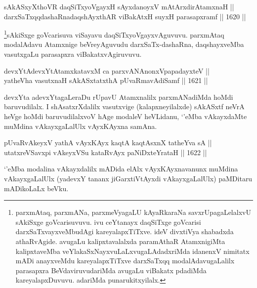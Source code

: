 
\begin{shl}
sAkASxyXthoVR daqSiTxyoVgayxH sAyxdanoyxV mAtArxdirAtamxnaH || \\
darxSaTxqqdashaRnadaqshAyxthAR viBakAtxH suyxH parasapxramf \hfill || 1620 ||  
\end{shl}

\begin{artha}
\footnote{parxmAtaq, parxmANa, parxmeVyagaLU kAyaRkaraNa savxrUpagaLelalxvU sAkiSxge goVcarisuvuvu. ivu ceYtanayx daqSiTxge goVcarisi darxSaTxvayxveMbudAgi kareyalapxTiTxve. ideV divxtiVya shabadxda athaRvAgide. avugaLu kalipxtavalalxda paramAthaR AtamxnigiMta kalipxtaveMba veYlakaSxNayxvuLaLxvugaLAdadxriMda idanenxV nimitatx mADi anayxveMdu kareyalapxTiTxve darxSaTxqq modalAdavugaLalilx parasapxra BeVdaviruvudariMda avugaLu viBakatx pdadiMda kareyalapxDuvuvu. adariMda punarukitxyilalx.}sAkiSxge goVcarisuva viSayavu daqSiTxyoVgayxvAguvuvu. parxmAtaq modalAdavu Atamxnige beVreyAguvudu darxSaTx-dashaRna, daqshayxveMba vasutxgaLu parasapxra viBakatxvAgiruvuvu.
\end{artha}


\begin{shl}
devxYtAdevxYtAtamxkatavxM ca parxvANAnonxVpapadayxteV || \\
yatheVha vasutxnaH sAkASxtatxthA pUvaRmavAdiSamf \hfill || 1621 ||  
\end{shl}

\begin{artha}
devxYta adevxYtagaLeraDu rUpavU Atamxnalilx parxmANadiMda hoMdi baruvudilalx. I shAsatxrXdalilx vasutxvige (kalapxneyilalxde) sAkASxtf neVrA heVge hoMdi baruvudilalxvoV hAge modaleV heVLidanu, `\stext'eMba vAkayxdaMte muMdina vAkayxgaLalUlx vAyxKAyxna samAna.
\end{artha}

\begin{shl}
pUvaRvAkeyxV yathA vAyxKAyx kaqtA kaqtAsxnX tatheYva sA || \\
utatxreVSavxpi vAkeyxVSu kataRvAyx paNiDxteYrataH \hfill || 1622 ||  
\end{shl}

\begin{artha}
`\stext'eMba modalina vAkayxdalilx mADida elAlx vAyxKAyxnavanunx muMdina vAkayxgaLalUlx (yadevxY tananx jiGarxtiVtAyxdi vAkayxgaLalUlx) paMDitaru mADikoLaLx beVku.  
\end{artha}

